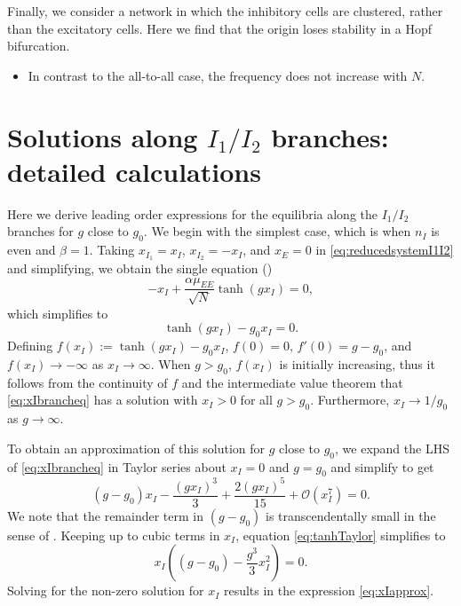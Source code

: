 \documentclass[reqno]{siamonline190516}
\begin{document}
Finally, we consider a network in which the inhibitory cells are clustered, rather than the excitatory cells. Here we find that the origin loses stability in a Hopf bifurcation. 
\begin{itemize}
    \item In contrast to the all-to-all case, the frequency does not increase with $N$.
\end{itemize}

\appendix

\section{Solutions along \texorpdfstring{$I_1/I_2$}{I1/I2} branches: detailed calculations}\label{app:I1I2sol}

Here we derive leading order expressions for the equilibria along the $I_1/I_2$ branches for $g$ close to $g_0$. We begin with the simplest case, which is when $n_I$ is even and $\beta = 1$. 
Taking $x_{I_1} = x_I$, $x_{I_2} = -x_I$, and $x_E = 0$ in \cref{eq:reducedsystemI1I2} and simplifying, we obtain the single equation (\cite[{Eq. 16}]{Barreiro2017})
\[
-x_I + \frac{\alpha \mu_{EE} }{\sqrt{N}} \tanh(g x_I) = 0, 
\]
which simplifies to 
\begin{equation}\label{eq:xIbrancheq}
\tanh(g x_I) - g_0 x_I = 0.
\end{equation}
Defining $f(x_I) := \tanh(g x_I) - g_0 x_I$, $f(0) = 0$, $f'(0) = g - g_0$, and $f(x_I) \rightarrow -\infty$ as $x_I \rightarrow \infty$. When $g > g_0$, $f(x_I)$ is initially increasing, thus it follows from the continuity of $f$ and the intermediate value theorem that \cref{eq:xIbrancheq} has a solution with $x_I > 0$ for all $g > g_0$. Furthermore, $x_I \rightarrow 1/g_0$ as $g \rightarrow \infty$.

To obtain an approximation of this solution for $g$ close to $g_0$, we expand the LHS of \cref{eq:xIbrancheq} in Taylor series about $x_I = 0$ and $g = g_0$ and simplify to get
\begin{equation}\label{eq:tanhTaylor}
(g-g_0) x_I - \frac{(g x_I)^3}{3} + \frac{2(g x_I)^5}{15} + \mathcal{O}\left( x_I^7 \right) = 0.
\end{equation}
We note that the remainder term in $(g-g_0)$ is transcendentally small in the sense of \cite{Holmes2012}. Keeping up to cubic terms in $x_I$, equation \cref{eq:tanhTaylor} simplifies to
\[
x_I \left( (g - g_0) - \frac{g^3}{3} x_I^2 \right) = 0.
\]
Solving for the non-zero solution for $x_I$ results in the expression \cref{eq:xIapprox}.
\end{document}

